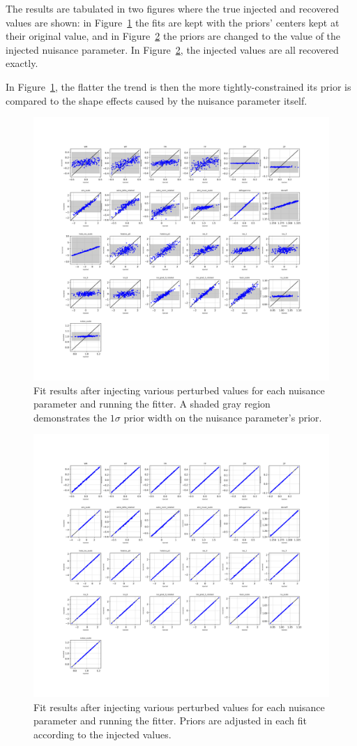 \documentclass[main.tex]{subfiles}
\begin{document}
The results are tabulated in two figures where the true injected and recovered values are shown: in Figure~\ref{fig:ir_nopriorpert} the fits are kept with the priors' centers kept at their original value, and in Figure~\ref{fig:ir_priorpert} the priors are changed to the value of the injected nuisance parameter. 
In Figure~\ref{fig:ir_priorpert}, the injected values are all recovered exactly. 

In Figure~\ref{fig:ir_nopriorpert}, the flatter the trend is then the more tightly-constrained its prior is compared to the shape effects caused by the nuisance parameter itself. 

\begin{figure}
    \centering 
    \includegraphics[width=0.7\linewidth]{figures/syst_ir_shuffle_nofix.png}
    \caption{Fit results after injecting various perturbed values for each nuisance parameter and running the fitter. A shaded gray region demonstrates the $1\sigma$ prior width on the nuisance parameter's prior.}\label{fig:ir_nopriorpert}
\end{figure}


\begin{figure}
    \centering 
    \includegraphics[width=0.7\linewidth]{figures/update_inject_recover_syst_prior.png}
    \caption{Fit results after injecting various perturbed values for each nuisance parameter and running the fitter. Priors are adjusted in each fit according to the injected values.}\label{fig:ir_priorpert}
\end{figure}
\end{document}
